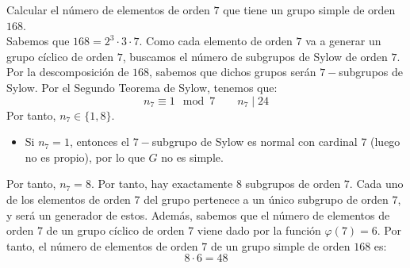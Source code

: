\begin{ejercicio}\label{ej:6.25}
    Calcular el número de elementos de orden $7$ que tiene un grupo simple de orden $168$.\\


    Sabemos que $168=2^3\cdot 3\cdot 7$. Como cada elemento de orden $7$ va a generar un grupo cíclico de orden $7$, buscamos el número de subgrupos de Sylow de orden $7$. Por la descomposición de $168$, sabemos que dichos grupos serán $7-$subgrupos de Sylow. Por el Segundo Teorema de Sylow, tenemos que:
    \begin{equation*}
        n_7\equiv 1\mod 7\qquad n_7\mid 24
    \end{equation*}
    Por tanto, $n_7\in \{1, 8\}$.
    \begin{itemize}
        \item Si $n_7=1$, entonces el $7-$subgrupo de Sylow es normal con cardinal $7$ (luego no es propio), por lo que $G$ no es simple.
    \end{itemize}

    Por tanto, $n_7=8$. Por tanto, hay exactamente $8$ subgrupos de orden $7$. Cada uno de los elementos de orden $7$ del grupo pertenece a un único subgrupo de orden $7$, y será un generador de estos. Además, sabemos que el número de elementos de orden $7$ de un grupo cíclico de orden $7$ viene dado por la función $\varphi(7) = 6$. Por tanto, el número de elementos de orden $7$ de un grupo simple de orden $168$ es:
    \begin{equation*}
        8\cdot 6 = 48
    \end{equation*}
\end{ejercicio}